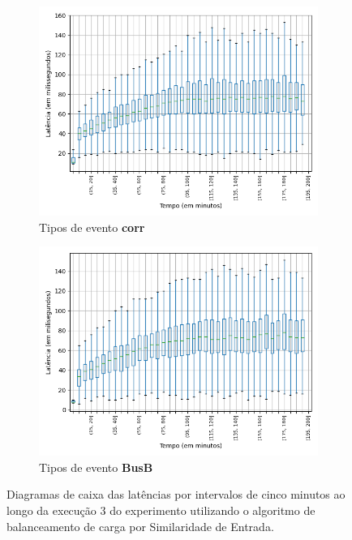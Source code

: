 \begin{figure}
\begin{subfigure}{.5\textwidth}
\centering
\includegraphics[width=\textwidth]{figuras/graphics/boxplot_8-dez-is_corr.png}
\caption{Tipos de evento \textbf{corr}}
\label{fig:BoxPlot_corr_IS_8-dez-is}
\end{subfigure}%
\begin{subfigure}{.5\textwidth}
\centering
\includegraphics[width=\textwidth]{figuras/graphics/boxplot_8-dez-is_busb.png}
\caption{Tipos de evento \textbf{BusB}}
\label{fig:BoxPlot_BusB_IS_8-dez-is}
\end{subfigure}%
\caption{Diagramas de caixa das latências por intervalos de cinco minutos ao longo da execução 3 do experimento utilizando o algoritmo de balanceamento de carga por Similaridade de Entrada.}
\end{figure}



